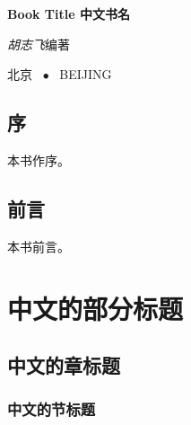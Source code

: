 \documentclass[a4paper,twoside]{ctexbook}
\begin{document}
\begin{titlepage}
  \centering
  \vspace*{25ex}
  { \textbf{Book Title 中文书名} \par}
  \vspace{10ex}
  { \textit{胡志飞}\quad{}编著 \par}
  \vfill
  {北京 ~$\bullet$ ~BEIJING}
\end{titlepage}
\thispagestyle{empty}


\frontmatter

\chapter*{序}

本书作序。


\chapter*{前言}

本书前言。


{
  \hypersetup{hidelinks}
  \tableofcontents
}

{
  \hypersetup{hidelinks}
  \lstlistoflistings
}


\mainmatter


\part{中文的部分标题}

\chapter{中文的章标题}

\hspace{.15\linewidth}\begin{minipage}[H]{.7\linewidth}
{
  \hypersetup{hidelinks}
  \startcontents[chapters]
}
\end{minipage}
\vspace{10ex}

\lipsum[3]

\section{中文的节标题}

\lipsum[3-5]
\end{document}
